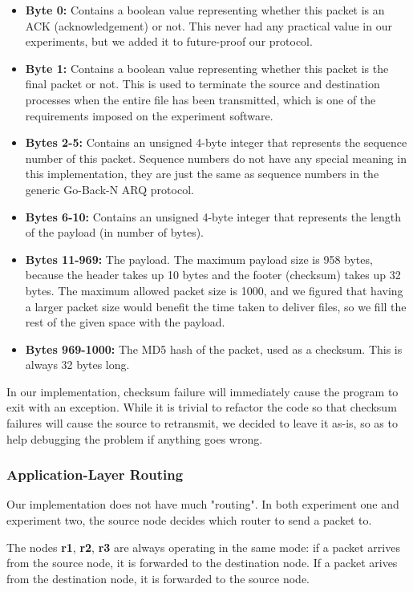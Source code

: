 \documentclass[conference]{IEEEtran}
\begin{document}
\begin{itemize}
    \item \textbf{Byte 0:} Contains a boolean value representing whether this packet is an ACK
    (acknowledgement) or not. This never had any practical value in our experiments, but we added
    it to future-proof our protocol.
    \item \textbf{Byte 1:} Contains a boolean value representing whether this packet is the final
    packet or not. This is used to terminate the source and destination processes when the entire
    file has been transmitted, which is one of the requirements imposed on the experiment software.
    \item \textbf{Bytes 2-5:} Contains an unsigned 4-byte integer that represents the sequence number
    of this packet. Sequence numbers do not have any special meaning in this implementation, they are
    just the same as sequence numbers in the generic Go-Back-N ARQ protocol.
    \item \textbf{Bytes 6-10:} Contains an unsigned 4-byte integer that represents the length of the
    payload (in number of bytes).
    \item \textbf{Bytes 11-969:} The payload. The maximum payload size is 958 bytes, because the
    header takes up 10 bytes and the footer (checksum) takes up 32 bytes. The maximum allowed packet
    size is 1000, and we figured that having a larger packet size would benefit the time taken to
    deliver files, so we fill the rest of the given space with the payload.
    \item \textbf{Bytes 969-1000:} The MD5 hash of the packet, used as a checksum.
    This is always 32 bytes long.
\end{itemize}

In our implementation, checksum failure will immediately cause the program to exit with an exception.
While it is trivial to refactor the code so that checksum failures will cause the source to retransmit,
we decided to leave it as-is, so as to help debugging the problem if anything goes wrong.

\subsubsection{Application-Layer Routing}
Our implementation does not have much "routing". In both experiment one and experiment two, the
source node decides which router to send a packet to.

The nodes \textbf{r1}, \textbf{r2}, \textbf{r3} are always operating in the same mode: if a packet
arrives from the source node, it is forwarded to the destination node. If a packet arives from the
destination node, it is forwarded to the source node.
\end{document}
